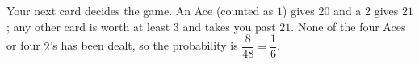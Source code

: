Your next card decides the game. An Ace (counted as $1$) gives $20$ and a $2$ gives $21$; any other card is worth at least $3$ and takes you past $21$. None of the four Aces or four $2$'s has been dealt, so the probability is $\dfrac{8}{48}=\boxed{\dfrac16}$.
